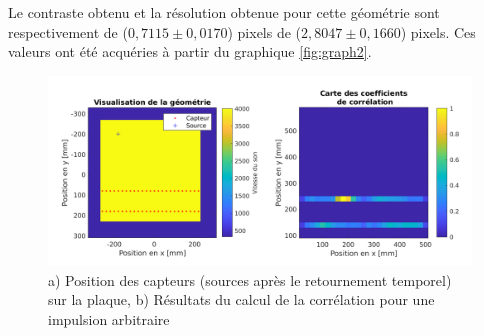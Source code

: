 \documentclass[conference]{IEEEtran}
\begin{document}
Le contraste obtenu et la résolution obtenue pour cette géométrie sont
respectivement de ($0,7115 \pm 0,0170$) pixels de ($2,8047 \pm 0,1660$) pixels. Ces valeurs ont 
été acquéries à partir du graphique \ref{fig:graph2}.



\begin{figure}[H]
  \centering
  \includegraphics[scale=0.2]{resultats1.png}
  \caption{a) Position des capteurs (sources après le retournement temporel)
  sur la plaque,  b) Résultats du calcul de la corrélation pour une impulsion arbitraire}
  \label{fig:graph1}
\end{figure}
\end{document}
